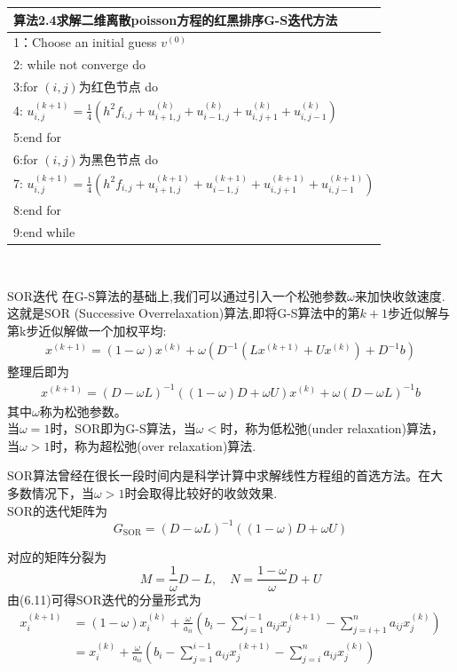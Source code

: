 \documentclass[notheorems,serif]{beamer}
\begin{document}
\begin{frame}
\begin{tabular}{l}
\hline
{\color{blue}算法2.4}求解二维离散poisson方程的红黑排序G-S迭代方法\\
\hline
1：Choose an initial guess $v^{(0)}$\\
2: while not converge do\\
3:\qquad for $(i,j)$为红色节点 do\\
4:\qquad \qquad
$u_{i, j}^{(k+1)}=\frac{1}{4}\left(h^{2} f_{i, j}+u_{i+1, j}^{(k)}+u_{i-1, j}^{(k)}+u_{i, j+1}^{(k)}+u_{i, j-1}^{(k)}\right)$\\
5:\qquad end for\\
6:\qquad for $(i,j)$为黑色节点 do\\
7:\qquad \qquad
$u_{i, j}^{(k+1)}=\frac{1}{4}\left(h^{2} f_{i, j}+u_{i+1, j}^{(k+1)}+u_{i-1, j}^{(k+1)}+u_{i, j+1}^{(k+1)}+u_{i, j-1}^{(k+1)}\right)$\\
8:\qquad end for\\
9:end while\\
\hline
\end{tabular}\\
\end{frame}

\begin{frame}
{SOR迭代}
在G-S算法的基础上,我们可以通过引入一个松弛参数$\omega$来加快收敛速度.这就是SOR (Successive Overrelaxation)算法,即将G-S算法中的第$k+1$步近似解与第k步近似解做一个加权平均:
\begin{align}
x^{(k+1)}=(1-\omega) x^{(k)}+\omega\left(D^{-1}\left(L x^{(k+1)}+U x^{(k)}\right)+D^{-1} b\right)\tag{6.10}
\end{align}
整理后即为
\begin{align}
x^{(k+1)}=(D-\omega L)^{-1}((1-\omega) D+\omega U) x^{(k)}+\omega(D-\omega L)^{-1} b\tag{6.11}
\end{align}
其中$\omega$称为{\color{blue}松弛参数}。\\
当$\omega=1$时，SOR即为G-S算法，当$\omega<$时，称为{\color{blue}低松弛(under relaxation)}算法，当$\omega>1$时，称为{\color{blue}超松弛(over relaxation)}算法.\\
\end{frame}

\begin{frame}
SOR算法曾经在很长一段时间内是科学计算中求解线性方程组的首选方法。在大多数情况下，当$\omega>1$时会取得比较好的收敛效果.\\
SOR的迭代矩阵为
$$
G_{\mathrm{SOR}}=(D-\omega L)^{-1}((1-\omega) D+\omega U)
$$

对应的矩阵分裂为
$$
M=\frac{1}{\omega} D-L, \quad N=\frac{1-\omega}{\omega} D+U
$$
由({\color{blue}6.11})可得SOR迭代的分量形式为
$$
\begin{aligned} x_{i}^{(k+1)} &=(1-\omega) x_{i}^{(k)}+\frac{\omega}{a_{i i}}\left(b_{i}-\sum_{j=1}^{i-1} a_{i j} x_{j}^{(k+1)}-\sum_{j=i+1}^{n} a_{i j} x_{j}^{(k)}\right) \\ &=x_{i}^{(k)}+\frac{\omega}{a_{i i}}\left(b_{i}-\sum_{j=1}^{i-1} a_{i j} x_{j}^{(k+1)}-\sum_{j=i}^{n} a_{i j} x_{j}^{(k)}\right) \end{aligned}
$$
\end{frame}
\end{document}
